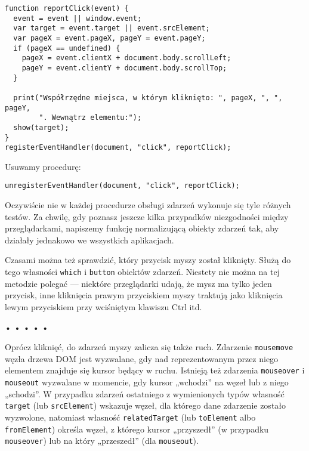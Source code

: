   
\begin{verbatim} 
function reportClick(event) {
  event = event || window.event;
  var target = event.target || event.srcElement;
  var pageX = event.pageX, pageY = event.pageY;
  if (pageX == undefined) {
    pageX = event.clientX + document.body.scrollLeft;
    pageY = event.clientY + document.body.scrollTop;
  }

  print("Współrzędne miejsca, w którym kliknięto: ", pageX, ", ", pageY,
        ". Wewnątrz elementu:");
  show(target);
}
registerEventHandler(document, "click", reportClick);
 \end{verbatim}
  
Usuwamy procedurę:

  
\begin{verbatim} 
unregisterEventHandler(document, "click", reportClick);
 \end{verbatim}
  
Oczywiście nie w każdej procedurze obsługi zdarzeń wykonuje się tyle różnych testów. Za chwilę, gdy poznasz jeszcze kilka przypadków niezgodności między przeglądarkami, napiszemy funkcję normalizującą obiekty zdarzeń tak, aby działały jednakowo we wszystkich aplikacjach.

  
Czasami można też sprawdzić, który przycisk myszy został kliknięty. Służą do tego własności \texttt{which} i \texttt{button} obiektów zdarzeń. Niestety nie można na tej metodzie polegać — niektóre przeglądarki udają, że mysz ma tylko jeden przycisk, inne kliknięcia prawym przyciskiem myszy traktują jako kliknięcia lewym przyciskiem przy wciśniętym klawiszu Ctrl itd.



\begin{center}
• • • • •
\end{center}

  
Oprócz kliknięć, do zdarzeń myszy zalicza się także ruch. Zdarzenie \texttt{mousemove} węzła drzewa DOM jest wyzwalane, gdy nad reprezentowanym przez niego elementem znajduje się kursor będący w ruchu. Istnieją też zdarzenia \texttt{mouseover} i \texttt{mouseout} wyzwalane w momencie, gdy kursor „wchodzi” na węzeł lub z niego „schodzi”. W przypadku zdarzeń ostatniego z wymienionych typów własność \texttt{target} (lub \texttt{srcElement}) wskazuje węzeł, dla którego dane zdarzenie zostało wyzwolone, natomiast własność \texttt{relatedTarget} (lub \texttt{toElement} albo \texttt{fromElement}) określa węzeł, z którego kursor „przyszedł” (w przypadku \texttt{mouseover}) lub na który „przeszedł” (dla \texttt{mouseout}).

